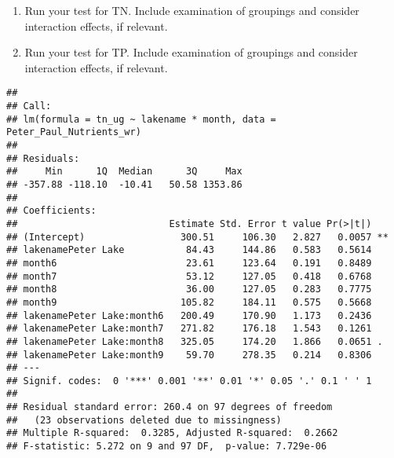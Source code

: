 \documentclass[]{article}
\newenvironment{Shaded}{\begin{snugshade}}{\end{snugshade}}
\newcommand{\CommentTok}[1]{\textcolor[rgb]{0.56,0.35,0.01}{\textit{#1}}}
\newcommand{\DataTypeTok}[1]{\textcolor[rgb]{0.13,0.29,0.53}{#1}}
\newcommand{\FloatTok}[1]{\textcolor[rgb]{0.00,0.00,0.81}{#1}}
\newcommand{\KeywordTok}[1]{\textcolor[rgb]{0.13,0.29,0.53}{\textbf{#1}}}
\newcommand{\NormalTok}[1]{#1}
\newcommand{\OperatorTok}[1]{\textcolor[rgb]{0.81,0.36,0.00}{\textbf{#1}}}
\newcommand{\StringTok}[1]{\textcolor[rgb]{0.31,0.60,0.02}{#1}}
\begin{document}
\begin{enumerate}
\def\labelenumi{\arabic{enumi}.}
\setcounter{enumi}{4}
\item
  Run your test for TN. Include examination of groupings and consider
  interaction effects, if relevant.
\item
  Run your test for TP. Include examination of groupings and consider
  interaction effects, if relevant.
\end{enumerate}

\begin{Shaded}
\end{Shaded}

\begin{verbatim}
## 
## Call:
## lm(formula = tn_ug ~ lakename * month, data = Peter_Paul_Nutrients_wr)
## 
## Residuals:
##     Min      1Q  Median      3Q     Max 
## -357.88 -118.10  -10.41   50.58 1353.86 
## 
## Coefficients:
##                           Estimate Std. Error t value Pr(>|t|)   
## (Intercept)                 300.51     106.30   2.827   0.0057 **
## lakenamePeter Lake           84.43     144.86   0.583   0.5614   
## month6                       23.61     123.64   0.191   0.8489   
## month7                       53.12     127.05   0.418   0.6768   
## month8                       36.00     127.05   0.283   0.7775   
## month9                      105.82     184.11   0.575   0.5668   
## lakenamePeter Lake:month6   200.49     170.90   1.173   0.2436   
## lakenamePeter Lake:month7   271.82     176.18   1.543   0.1261   
## lakenamePeter Lake:month8   325.05     174.20   1.866   0.0651 . 
## lakenamePeter Lake:month9    59.70     278.35   0.214   0.8306   
## ---
## Signif. codes:  0 '***' 0.001 '**' 0.01 '*' 0.05 '.' 0.1 ' ' 1
## 
## Residual standard error: 260.4 on 97 degrees of freedom
##   (23 observations deleted due to missingness)
## Multiple R-squared:  0.3285, Adjusted R-squared:  0.2662 
## F-statistic: 5.272 on 9 and 97 DF,  p-value: 7.729e-06
\end{verbatim}
\end{document}
